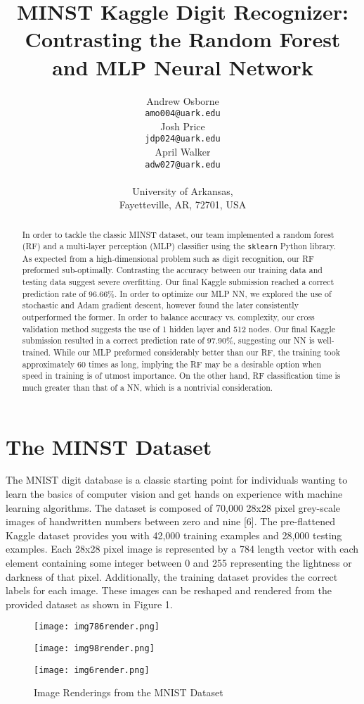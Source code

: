 \documentclass{article}
\title{MINST Kaggle Digit Recognizer: Contrasting the Random Forest and MLP Neural Network}
\author{%
   Andrew Osborne \\
   \texttt{amo004@uark.edu} \\
   \And
   Josh Price \\
   \texttt{jdp024@uark.edu} \\
   \AND
   April Walker \\
   \texttt{adw027@uark.edu} \\
   \\
   University of Arkansas, \\
   Fayetteville, AR, 72701, USA
}
\begin{document}

\maketitle

\begin{abstract}
  In order to tackle the classic MINST dataset, our team implemented a random forest (RF) and a multi-layer perception (MLP) classifier using the \verb+sklearn+ Python library. As expected from a high-dimensional problem such as digit recognition, our RF preformed sub-optimally. Contrasting the accuracy between our training data and testing data suggest severe overfitting. Our final Kaggle submission reached a correct prediction rate of 96.66\%. In order to optimize our MLP NN, we explored the use of stochastic and Adam gradient descent, however found the later consistently outperformed the former. In order to balance accuracy vs. complexity, our cross validation method suggests the use of 1 hidden layer and 512 nodes. Our final Kaggle submission resulted in a correct prediction rate of 97.90\%, suggesting our NN is well-trained. While our MLP preformed considerably better than our RF, the training took approximately 60 times as long, implying the RF may be a desirable option when speed in training is of utmost importance. On the other hand, RF classification time is much greater than that of a NN, which is a nontrivial consideration.
\end{abstract}

\section{The MINST Dataset}
The MNIST digit database is a classic starting point for individuals wanting to learn the basics of computer vision and get hands on experience with machine learning algorithms. The dataset is composed of 70,000 28x28 pixel grey-scale images of handwritten numbers between zero and nine [6]. The pre-flattened Kaggle dataset provides you with 42,000 training examples and 28,000 testing examples. Each 28x28 pixel image is represented by a 784 length vector with each element containing some integer between 0 and 255 representing the lightness or darkness of that pixel. Additionally, the training dataset provides the correct labels for each image. These images can be reshaped and rendered from the provided dataset as shown in Figure 1.
\begin{figure}[h]
  \centering
    \begin{minipage}[t]{0.3\textwidth}
        \texttt{[image: img786render.png]}
    \end{minipage}
    \begin{minipage}[t]{0.3\textwidth}
        \texttt{[image: img98render.png]}
    \end{minipage}
    \begin{minipage}[t]{0.3\textwidth}
        \texttt{[image: img6render.png]}
    \end{minipage}
  \caption{Image Renderings from the MNIST Dataset}
\end{figure}
\end{document}

